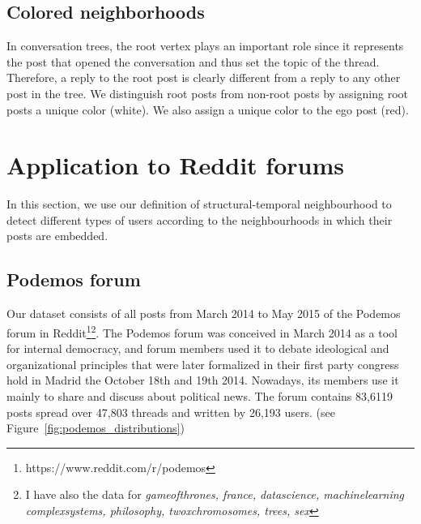 \documentclass[9pt,technote]{IEEEtran}
\begin{document}
\subsection{Colored neighborhoods}
In conversation trees, the root vertex plays an important role since it represents the post that opened the conversation and thus set the topic of the thread. Therefore, a reply to the root post is clearly different from a reply to any other post in the tree. We distinguish root posts from non-root posts by assigning root posts a unique color (white). We also assign a unique color to the ego post (red). 


\section{Application to Reddit forums}
In this section, we use our definition of structural-temporal neighbourhood to detect different types of users according to the neighbourhoods in which their posts are embedded.

\subsection{Podemos forum}
Our dataset consists of all posts from March 2014 to May 2015 of the Podemos forum in Reddit\footnote{https://www.reddit.com/r/podemos}\footnote{I have also the data for \textit{gameofthrones, france, datascience, machinelearning complexsystems, philosophy, twoxchromosomes, trees, sex}}. The Podemos forum was conceived in March 2014 as a tool for internal democracy, and forum members used it to debate ideological and organizational principles that were later formalized in their first party congress hold in Madrid the October 18th and 19th 2014. Nowadays, its members use it mainly to share and discuss about political news.
The forum contains 83,6119 posts spread over 47,803 threads and written by 26,193 users. (see Figure~\ref{fig:podemos_distributions})
\end{document}
